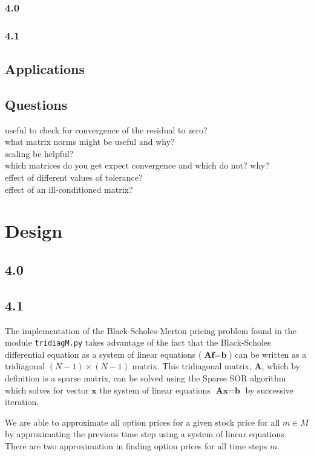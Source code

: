 \documentclass[paper=a4, fontsize=10pt]{article} %
\begin{document}
\subsubsection{4.0}
\subsubsection{4.1}

\subsection{Applications}

\subsection{Questions}
useful to check for convergence of the residual to zero?\\
what matrix norms might be useful and why?\\
scaling be helpful?\\
which matrices do you get expect convergence and which do not? why?\\
effect of different values of tolerance?\\
effect of an ill-conditioned matrix?\\

\section{Design}

\subsection{4.0}
\subsection{4.1}

The implementation of the Black-Scholes-Merton pricing problem found in the module \texttt{tridiagM.py} takes advantage of the fact that the Black-Scholes differential equation as a system of linear equations ($\textbf{A}\textbf{f} = \textbf{b}$) can be written as a tridiagonal $(N-1)\times(N-1)$ matrix. This tridiagonal matrix, $\textbf{A}$, which by definition is a sparse matrix, can be solved using the Sparse SOR algorithm
 which solves for vector $\textbf{x}$ the system of linear equations $\textbf{A}\textbf{x} = \textbf{b}$ by successive iteration. 

We are able to approximate all option prices for a given stock price for all $m \in M$ by approximating the previous time step using a system of linear equations. There are two approximation in finding option prices for all time steps $m$. 
\end{document}
